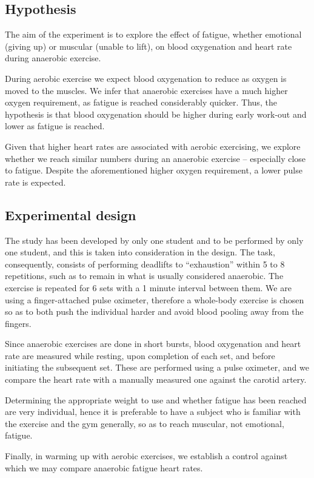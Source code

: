 \subsection*{Hypothesis}
	The aim of the experiment is to explore the effect of fatigue, whether emotional (giving up) or muscular (unable to lift), on blood oxygenation and heart rate during anaerobic exercise.  

	During aerobic exercise we expect blood oxygenation to reduce as oxygen is moved to the muscles. We infer that anaerobic exercises have a much higher oxygen requirement, as fatigue is reached considerably quicker. Thus, the hypothesis is that blood oxygenation should be higher during early work-out and lower as fatigue is reached.

	Given that higher heart rates are associated with aerobic exercising, we explore whether we reach similar numbers during an anaerobic exercise -- especially close to fatigue. Despite the aforementioned higher oxygen requirement, a lower pulse rate is expected.

\subsection*{Experimental design}
	The study has been developed by only one student and to be performed by only one student, and this is taken into consideration in the design. The task, consequently, consists of performing deadlifts to ``exhaustion'' within 5 to 8 repetitions, such as to remain in what is usually considered anaerobic. The exercise is repeated for 6 sets with a 1 minute interval between them.
	We are using a finger-attached pulse oximeter, therefore a whole-body exercise is chosen so as to both push the individual harder and avoid blood pooling away from the fingers.

	Since anaerobic exercises are done in short bursts, blood oxygenation and heart rate are measured while resting, upon completion of each set, and before initiating the subsequent set. These are performed using a pulse oximeter, and we compare the heart rate with a manually measured one against the carotid artery. 

	Determining the appropriate weight to use and whether fatigue has been reached are very individual, hence it is preferable to have a subject who is familiar with the exercise and the gym generally, so as to reach muscular, not emotional, fatigue.

	Finally, in warming up with aerobic exercises, we establish a control against which we may compare anaerobic fatigue heart rates.